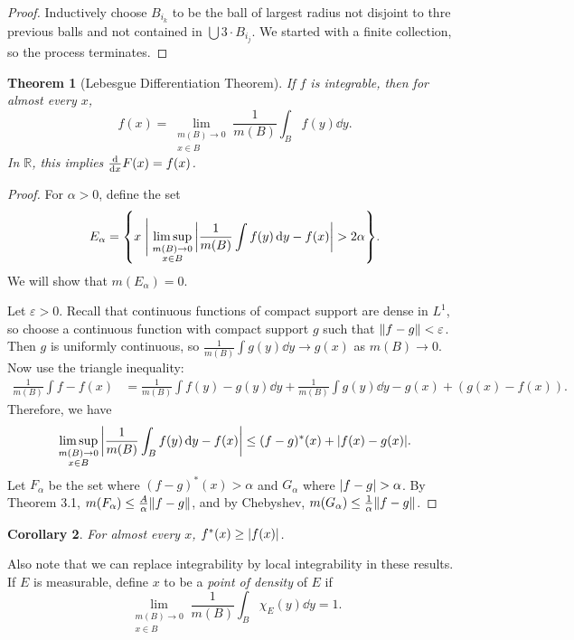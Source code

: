 \documentclass[leqno, openany]{memoir}
\newtheorem{thm}{Theorem}[chapter]
\newtheorem{cor}[thm]{Corollary}
\theoremstyle{definition}
\theoremstyle{remark}
\theoremstyle{plain}
\theoremstyle{definition}
\theoremstyle{remark}
\newcommand{\R}{\mathbb{R}}
\newcommand{\ep}{\varepsilon}
\begin{document}
\begin{proof}
    Inductively choose $B_{i_k}$ to be the ball of largest radius not disjoint to thre previous balls and not contained in $\bigcup 3 \cdot B_{i_j}$. We started with a finite collection, so the process terminates.
\end{proof}

\begin{thm}[Lebesgue Differentiation Theorem]
    If $f$ is integrable, then for almost every $x$,
    \[ f(x) = \lim_{\substack{m(B) \to 0 \\ x \in B}} \frac{1}{m(B)} \int_B f(y) \dd{y}. \]
    In $\R$, this implies $\dv{x} F(x) = f(x)$.
\end{thm}

\begin{proof}
    For $\alpha > 0$, define the set
    \[ E_{\alpha} = \qty{x \mathrel{\Bigg|} \limsup_{\substack{m(B) \to 0 \\ x \in B}} \abs{\frac{1}{m(B)} \int f(y) \dd{y} - f(x)} > 2\alpha}. \]
    We will show that $m(E_{\alpha}) = 0$.

    Let $\ep > 0$. Recall that continuous functions of compact support are dense in $L^1$, so choose a continuous function with compact support $g$ such that $\norm{f-g} < \ep$. Then $g$ is uniformly continuous, so $\frac{1}{m(B)} \int g(y) \dd{y} \to g(x)$ as $m(B) \to 0$. Now use the triangle inequality:
    \begin{align*}
        \frac{1}{m(B)} \int f - f(x) &= \frac{1}{m(B)} \int f(y) - g(y) \dd{y} + \frac{1}{m(B)} \int g(y) \dd{y} - g(x) + (g(x) - f(x)). 
    \end{align*}
    Therefore, we have
    \[ \limsup_{\substack{m(B) \to 0 \\ x \in B}} \abs{\frac{1}{m(B)} \int_B f(y) \dd{y} - f(x)} \leq (f-g)^*(x) + \abs{f(x) - g(x)}. \]
    Let $F_{\alpha}$ be the set where $(f-g)^*(x) > \alpha$ and $G_{\alpha}$ where $\abs{f - g} > \alpha$. By Theorem 3.1, $m(F_{\alpha}) \leq \frac{A}{\alpha} \norm{f-g}$, and by Chebyshev, $m(G_{\alpha}) \leq \frac{1}{\alpha} \norm{f-g}$.
\end{proof}

\begin{cor}
    For almost every $x$, $f^*(x) \geq \abs{f(x)}$.
\end{cor}

Also note that we can replace integrability by local integrability in these results. If $E$ is measurable, define $x$ to be a \textit{point of density} of $E$ if 
\[ \lim_{\substack{m(B) \to 0 \\ x \in B}} \frac{1}{m(B)} \int_B \chi_E(y) \dd{y} = 1. \]
\end{document}
